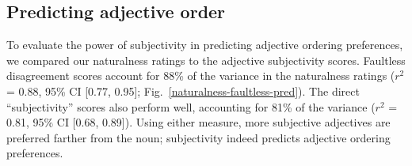\documentclass{pnastwo}
\begin{document}
\begin{article}
\section{Predicting adjective order}

To evaluate the power of subjectivity in predicting adjective ordering preferences, we compared our naturalness ratings to the adjective subjectivity scores.
Faultless disagreement scores account for  88\% of the variance in the naturalness ratings ($r^2$ = 0.88, 95\% CI [0.77, 0.95]; Fig.~\ref{naturalness-faultless-pred}).
The direct ``subjectivity'' scores also perform well, accounting for 81\% of the variance ($r^2$ = 0.81, 95\% CI [0.68, 0.89]).
Using either measure, more subjective adjectives are preferred farther from the noun; subjectivity indeed predicts adjective ordering preferences.



\end{article}
\end{document}
